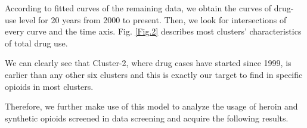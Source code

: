 \documentclass[11pt]{article}
\begin{document}

According to fitted curves of the remaining data, we obtain the curves of drug-use level for 20 years from 2000 to present. Then, we look for intersections of every curve and the time axis. Fig. \ref{Fig.2} describes most clusters’ characteristics of total drug use.

We can clearly see that Cluster-2, where drug cases have started since 1999, is earlier than any other six clusters and this is exactly our target to find in specific opioids in most clusters.

Therefore, we further make use of this model to analyze the usage of heroin and synthetic opioids screened in data screening and acquire the following results.
\end{document}
